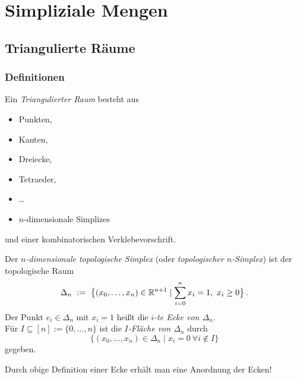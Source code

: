 \chapter{Simpliziale Mengen}
\section{Triangulierte Räume}
\subsection{Definitionen}

\begin{definition}
  Ein \emph{Triangulierter Raum} besteht aus
  \begin{itemize}
    \item Punkten,
    \item Kanten,
    \item Dreiecke,
    \item Tetraeder,
    \item \ldots
    \item $n$-dimensionale Simplizes
  \end{itemize}
  und einer kombinatorischen Verklebevorschrift.
\end{definition}

\begin{definition}
  Der \emph{$n$-dimensionale topologische Simplex} (oder \emph{topologischer
  $n$-Simplex}) ist der topologische Raum
  \[ \Delta_n \ :=\  \big\{(x_0,\ldots,x_n) \in \mathbb{R}^{n+1} \mid 
    \sum_{i=0}^n x_i = 1,\ x_i \geq 0\big\}\,.\]
  Der Punkt $e_i \in \Delta_n$ mit $x_i=1$ heißt die \emph{$i$-te Ecke von
  $\Delta_n$}.\\
  Für $I \subseteq [n] := \{0,\ldots,n\}$ ist die \emph{$I$-Fläche von
  $\Delta_n$} durch
  \[ \big\{(x_0,\ldots, x_n) \in \Delta_n \mid 
    x_i = 0 \ \forall i\notin I\big\}\]
  gegeben.
\end{definition}

\begin{bemerkung}
  Durch obige Definition einer Ecke erhält man eine Anordnung der Ecken!
\end{bemerkung}

